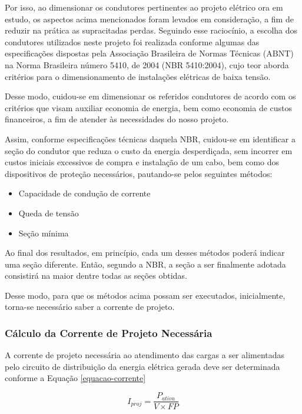 Por isso, ao dimensionar os condutores pertinentes ao projeto elétrico ora em estudo, os aspectos acima mencionados foram levados em consideração, a fim de reduzir na prática as supracitadas perdas.
Seguindo esse raciocínio, a escolha dos condutores utilizados neste projeto foi realizada conforme algumas das especificações dispostas pela Associação Brasileira de Normas Técnicas (ABNT) na Norma Brasileira número 5410, de 2004 (NBR 5410:2004), cujo teor aborda critérios para o dimensionamento de instalações elétricas de baixa tensão.

Desse modo, cuidou-se em dimensionar os referidos condutores de acordo com os critérios que visam auxiliar economia de energia, bem como economia de custos financeiros, a fim de atender às necessidades do nosso projeto.

Assim, conforme especificações técnicas daquela NBR, cuidou-se em identificar a seção do condutor que reduza o custo da energia desperdiçada, sem incorrer em custos iniciais excessivos de compra e instalação de um cabo, bem como dos dispositivos de proteção necessários, pautando-se pelos seguintes métodos:

\begin{itemize}

	\item Capacidade de condução de corrente
	\item Queda de tensão
	\item Seção mínima
\end{itemize}

Ao final dos resultados, em princípio, cada um desses métodos poderá indicar uma seção diferente. Então, segundo a NBR, a seção a ser finalmente adotada consistirá na maior dentre todas as seções obtidas.

Desse modo, para que os métodos acima possam ser executados, inicialmente, torna-se necessário saber a corrente de projeto.

\subsubsection{Cálculo da Corrente de Projeto Necessária}

A corrente de projeto necessária ao atendimento das cargas a ser alimentadas pelo circuito de distribuição da energia elétrica gerada deve ser determinada conforme a Equação \ref{equacao-corrente}

\begin{equation}
	{I}_{proj} = \frac{{P}_{ativa}}{V \times FP}
	\label{equacao-corrente}
\end{equation}

